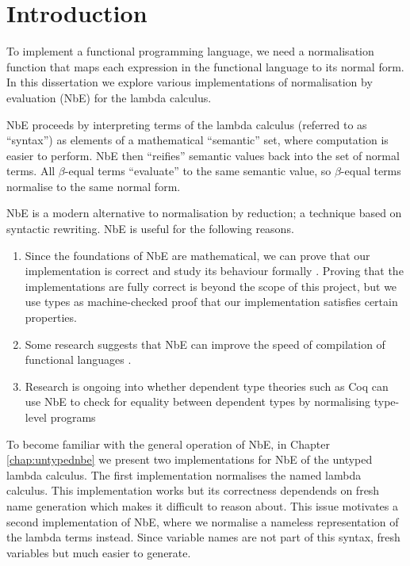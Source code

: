 \chapter{Introduction}
\label{chap:introduction}

To implement a functional programming language, we need a normalisation function that maps each expression in the functional language to its normal form.
In this dissertation we explore various implementations of normalisation by evaluation (NbE) for the lambda calculus.

NbE proceeds by interpreting terms of the lambda calculus (referred to as “syntax”) as elements of a mathematical “semantic” set, where computation is easier to perform. NbE then “reifies” semantic values back into the set of normal terms. All $\beta$-equal terms “evaluate” to the same semantic value, so $\beta$-equal terms normalise to the same normal form.

NbE is a modern alternative to normalisation by reduction; a technique based on syntactic rewriting. NbE is useful for the following reasons.

\begin{enumerate}
    \item Since the foundations of NbE are mathematical, we can prove that our implementation is correct and study its behaviour formally \cite{AgdaNbe}. Proving that the implementations are fully correct is beyond the scope of this project, but we use types as machine-checked proof that our implementation satisfies certain properties.
    \item Some research suggests that NbE can improve the speed of compilation of functional languages \cite{efficientNbE}.
    \item Research is ongoing into whether dependent type theories such as Coq can use NbE to check for equality between dependent types by normalising type-level programs 
\end{enumerate}

To become familiar with the general operation of NbE, in Chapter \ref{chap:untypednbe} we present two implementations for NbE of the untyped lambda calculus. The first implementation normalises the named lambda calculus. This implementation works but its correctness dependends on fresh name generation which makes it difficult to reason about. This issue motivates a second implementation of NbE, where we normalise a nameless representation of the lambda terms instead. Since variable names are not part of this syntax, fresh variables but much easier to generate.

